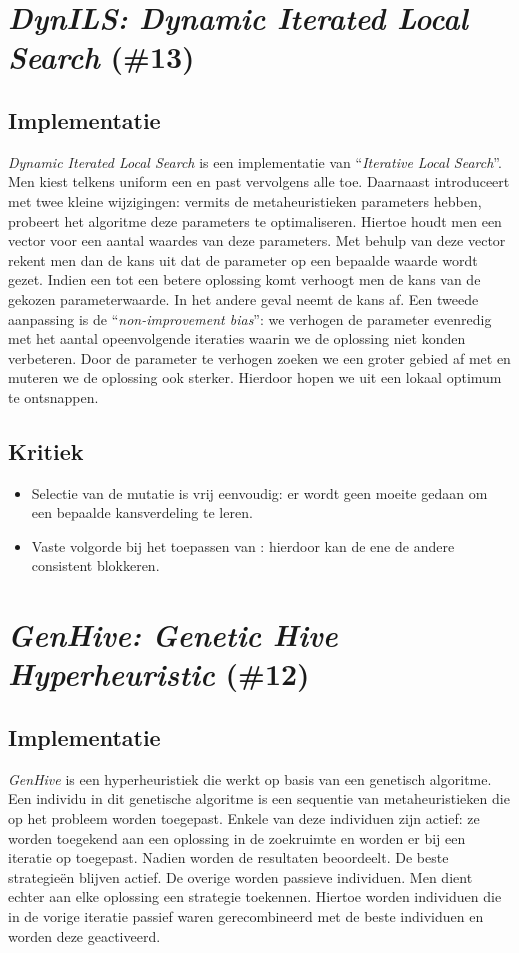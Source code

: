 \section{\emph{DynILS: Dynamic Iterated Local Search} (\#13)}
\label{sss:dyn-ils}
\subsection{Implementatie}
\emph{Dynamic Iterated Local Search}\cite{chesc-dynils,journals/orsnz/ksosils} is een implementatie van ``\emph{Iterative Local Search}''\cite{Lourenco02iteratedlocal}. Men kiest telkens uniform een \abpte{} \abllh{} en past vervolgens alle \abls{} \abhn{} toe. Daarnaast introduceert met twee kleine wijzigingen: vermits de metaheuristieken parameters hebben, probeert het algoritme deze parameters te optimaliseren. Hiertoe houdt men een vector voor een aantal waardes van deze parameters. Met behulp van deze vector rekent men dan de kans uit dat de parameter op een bepaalde waarde wordt gezet. Indien een \abllh{} tot een betere oplossing komt verhoogt men de kans van de gekozen parameterwaarde. In het andere geval neemt de kans af. Een tweede aanpassing is de ``\emph{non-improvement bias}'': we verhogen de parameter evenredig met het aantal opeenvolgende iteraties waarin we de oplossing niet konden verbeteren. Door de parameter te verhogen zoeken we een groter gebied af met \abls{} en muteren we de oplossing ook sterker. Hierdoor hopen we uit een lokaal optimum te ontsnappen.
\subsection{Kritiek}
\begin{itemize}
 \item Selectie van de mutatie is vrij eenvoudig: er wordt geen moeite gedaan om een bepaalde kansverdeling te leren.
 \item Vaste volgorde bij het toepassen van \abls{}: hierdoor kan de ene \abls{} \abh{} de andere consistent blokkeren.
\end{itemize}
\section{\emph{GenHive: Genetic Hive Hyperheuristic} (\#12)}
\label{sss:genhive}
\subsection{Implementatie}
\emph{GenHive}\cite{chesc-genhive} is een hyperheuristiek die werkt op basis van een genetisch algoritme. Een individu in dit genetische algoritme is een sequentie van metaheuristieken die op het probleem worden toegepast. Enkele van deze individuen zijn actief: ze worden toegekend aan een oplossing in de zoekruimte en worden er bij een iteratie op toegepast. Nadien worden de resultaten beoordeelt. De beste strategie\"en blijven actief. De overige worden passieve individuen. Men dient echter aan elke oplossing een strategie toekennen. Hiertoe worden individuen die in de vorige iteratie passief waren gerecombineerd met de beste individuen en worden deze geactiveerd.
